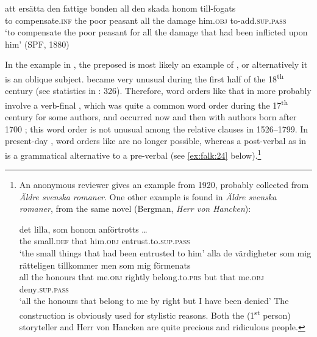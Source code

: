 \documentclass[output=paper]{langscibook}
\begin{document}
\ex\label{ex:falk:22d}
\gll att    ersätta        den  fattige  bonden    all  den  skada    honom till-fogats\\
      to    compensate.\textsc{inf}  the  poor    peasant  all  the  damage  him.\textsc{obj}         to-add\textsc{.sup.pass}\\
\glt ‘to compensate the poor peasant for all the damage that had been inflicted upon       him’ (SPF, 1880)
\z
\z

In the  example in , the preposed  is most likely an example of , or alternatively it is an oblique subject.  became very unusual during the first half of the 18\textsuperscript{th} century (see statistics in \citealt{Falk1993}: 326). Therefore, word orders like that in  more probably involve a verb-final , which was quite a common word order during the 17\textsuperscript{th} century for some authors, and occurred now and then with authors born after 1700 \citep{Platzack1983}; this word order is not unusual among the relative clauses in 1526–1799. In present-day , word orders like  are no longer possible, whereas a post-verbal  as in  is a grammatical alternative to a pre-verbal  (see \ref{ex:falk:24} below).\footnote{An anonymous reviewer gives an example from 1920, probably collected from \textit{Äldre svenska romaner}. One other example is found in \textit{Äldre svenska romaner}, from the same novel (Bergman, \textit{Herr von Hancken}):

\ea \gll det  lilla,    som  honom    anförtrotts …\\
        the  small.\textsc{def}  that  him.\textsc{obj}  entrust.to.\textsc{sup.pass}\\
        \glt  ‘the small things that had been entrusted to him’
\ex  \gll alla de  värdigheter  som  mig    rätteligen  tillkommer    men  som  mig    förmenats\\
         all the  honours    that  me.\textsc{obj}  rightly    belong.to.\textsc{prs}  but  that  me.\textsc{obj}  deny\textsc{.sup.pass}\\
       \glt ‘all the honours that belong to me by right but I have been denied’
\z The construction is obviously used for stylistic reasons. Both the (1\textsuperscript{st} person) storyteller and Herr von Hancken are quite precious and ridiculous people.}
\end{document}
